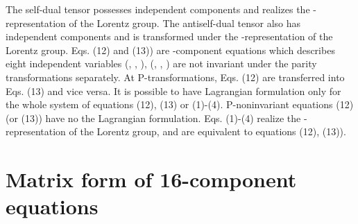\documentclass[a4paper,12pt]{article}
\begin{document}
The self-dual tensor \coordHE{} possesses \coordHE{} independent
components and realizes the \coordHE{}-representation of
the Lorentz group. The antiself-dual tensor \coordHE{} also
has \coordHE{} independent components and is transformed under the
\coordHE{}-representation of the Lorentz group. Eqs.
(12) and (13)) are \coordHE{}-component equations which describes eight
independent variables (\coordHE{}, \coordHE{} , \coordHE{}),
(\coordHE{}, \coordHE{}, \coordHE{}) are not invariant under the
parity transformations separately. At P-transformations, Eqs. (12)
are transferred into Eqs. (13) and vice versa. It is possible to
have Lagrangian formulation only for the whole system of equations
(12), (13) or (1)-(4). P-noninvariant equations (12) (or (13))
have no the Lagrangian formulation. Eqs. (1)-(4) realize the
\coordHE{}-representation of the
Lorentz group, and are equivalent to equations (12), (13)).

\section{Matrix form of 16-component equations}
\end{document}
